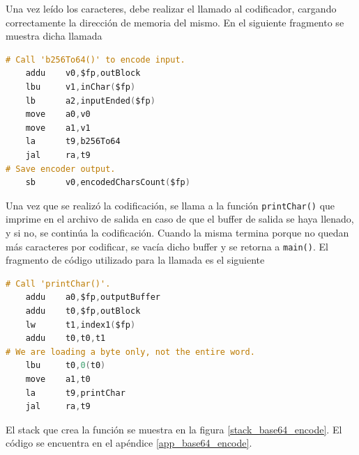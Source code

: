 Una vez leído los caracteres, debe realizar el llamado al codificador, cargando correctamente la dirección de memoria del mismo. En el siguiente fragmento se muestra dicha llamada
\begin{lstlisting}[language=C, style=StyleC]
# Call 'b256To64()' to encode input.
	addu	v0,$fp,outBlock
	lbu	    v1,inChar($fp)
	lb	    a2,inputEnded($fp)
	move	a0,v0
	move    a1,v1
	la	    t9,b256To64
	jal	    ra,t9
# Save encoder output.
	sb	    v0,encodedCharsCount($fp)
\end{lstlisting}

Una vez que se realizó la codificación, se llama a la función \texttt{printChar()} que imprime en el archivo de salida en caso de que el buffer de salida se haya llenado, y si no, se continúa la codificación. Cuando la misma termina porque no quedan más caracteres por codificar, se vacía dicho buffer y se retorna a \texttt{main()}. El fragmento de código utilizado para la llamada es el siguiente
\begin{lstlisting}[language=C, style=StyleC]
# Call 'printChar()'.
	addu	a0,$fp,outputBuffer
	addu	t0,$fp,outBlock
	lw	    t1,index1($fp)
	addu	t0,t0,t1
# We are loading a byte only, not the entire word.
	lbu	    t0,0(t0)
	move	a1,t0
	la	    t9,printChar
	jal	    ra,t9
\end{lstlisting}

El stack que crea la función se muestra en la figura \ref{stack_base64_encode}. El código se encuentra en el apéndice \ref{app_base64_encode}.

